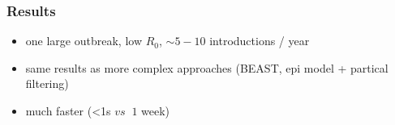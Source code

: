 \documentclass[Xcolor=svgnames,mathserif]{beamer}
\begin{document}
\begin{frame}[fragile]
  \frametitle{Results}

  
  \begin{center}
  \end{center}


  \pause
  \begin{itemize}
  \item one large outbreak, low $R_0$, $\sim 5-10$ introductions / year
  \item same results as more complex approaches (BEAST, epi model + partical filtering)
  \item much faster (<1s $vs$ $~1$ week)
  \end{itemize}

\end{frame}
\end{document}
